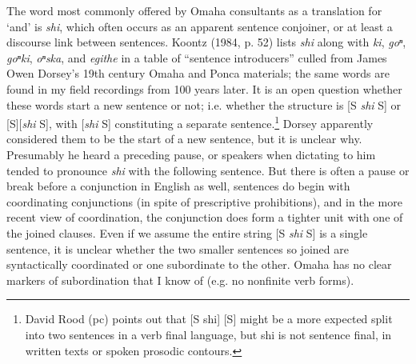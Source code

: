 \documentclass[output=paper]{LSP/langsci}
\begin{document}
    The word most commonly offered by Omaha consultants as a translation for `and' is \textit{shi}, which often occurs as an apparent sentence conjoiner, or at least a discourse link between sentences. Koontz (1984, p. 52) lists \textit{shi} along with \textit{ki}, \textit{goⁿ}, \textit{goⁿki}, \textit{oⁿska}, and \textit{egithe} in a table of ``sentence introducers'' culled from James Owen Dorsey's 19th century Omaha and Ponca materials; the same words are found in my field recordings from 100 years later.  It is an open question whether these words start a new sentence or not; i.e. whether the structure is [S \textit{shi} S] or [S][\textit{shi} S], with [\textit{shi} S] constituting a separate sentence.\footnote{David Rood (pc) points out that [S shi] [S] might be a more expected split into two sentences in a verb final language, but shi is not sentence final, in written texts or spoken prosodic contours.}  Dorsey apparently considered them to be the start of a new sentence, but it is unclear why. Presumably he heard a preceding pause, or speakers when dictating to him tended to pronounce \textit{shi} with the following sentence. But there is often a pause or break before a conjunction in English as well, sentences do begin with coordinating conjunctions (in spite of prescriptive prohibitions), and in the more recent view of coordination, the conjunction does form a tighter unit with one of the joined clauses. Even if we assume the entire string [S \textit{shi} S] is a single sentence, it is unclear whether the two smaller sentences so joined are syntactically coordinated or one subordinate to the other. Omaha has no clear markers of subordination that I know of (e.g. no nonfinite verb forms).  
\end{document}
